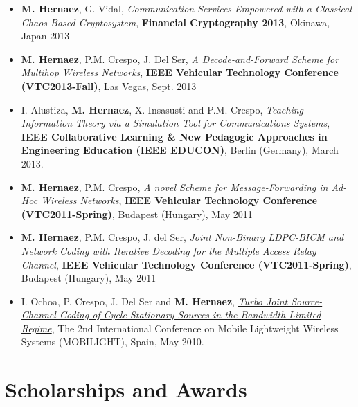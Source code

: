 \documentclass[11pt,a4paper,sans]{moderncv}        %
\begin{document}
\begin{itemize}
\item \textbf{M. Hernaez}, G. Vidal, {\emph {Communication Services Empowered with a Classical Chaos Based Cryptosystem}, \textbf{Financial Cryptography 2013}}, Okinawa, Japan 2013 \\

\item \textbf{M. Hernaez}, P.M. Crespo, J. {Del Ser}, {\emph{A Decode-and-Forward Scheme for Multihop Wireless Networks}, \textbf{IEEE Vehicular Technology Conference (VTC2013-Fall)}}, Las Vegas, Sept. 2013\\

\item I. Alustiza, \textbf{M. Hernaez}, X. Insasusti and P.M. Crespo, {\emph{ Teaching Information Theory via a Simulation Tool for Communications Systems}}, \textbf{IEEE Collaborative Learning \& New Pedagogic Approaches in Engineering Education (IEEE EDUCON)}, Berlin (Germany), March  2013.\\

\item \textbf{M. Hernaez}, P.M. Crespo, \emph{A novel Scheme for Message-Forwarding in Ad-Hoc Wireless Networks}, \textbf{IEEE Vehicular Technology Conference (VTC2011-Spring)}, Budapest (Hungary), May 2011 \\

\item \textbf{M. Hernaez}, P.M. Crespo, J. del Ser, \emph{ Joint Non-Binary LDPC-BICM and Network Coding with Iterative Decoding for the Multiple Access Relay Channel}, \textbf{IEEE Vehicular Technology Conference (VTC2011-Spring)}, Budapest (Hungary),  May 2011 \\

\item {I. Ochoa, P. Crespo, J. Del Ser and \textbf{M. Hernaez}, \href{http://web.stanford.edu/~iochoa/publishedPublications/2010_mobilight.pdf}{\emph{ Turbo Joint Source-Channel Coding of Cycle-Stationary Sources in the Bandwidth-Limited Regime}}, The 2nd International Conference on Mobile Lightweight Wireless Systems (MOBILIGHT), Spain, May 2010.}\\
 
 \end{itemize}
 
 

\section{Scholarships and Awards}
\end{document}
